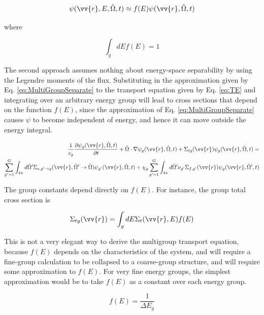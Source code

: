 \documentclass[10pt]{article}
\newcommand{\hO}{\hat{\Omega}}
\newcommand{\spa}{(\vv{r}, E, \hO, t)}
\begin{document}
\begin{flushleft}
\begin{equation}
\label{eq:MultiGroupSeparate}
\psi\spa  \approx f(E)\psi(\vv{r}, \hO  ,t)
\end{equation}

where

\begin{equation}
\label{eq:f_E_normalized}
\int_{g} dEf(E) = 1
\end{equation}

The second approach assumes nothing about energy-space separability by using the Legendre moments of the flux. Substituting in the approximation given by Eq. \ref{eq:MultiGroupSeparate} to the transport equation given by Eq. \ref{eq:TE} and integrating over an arbitrary energy group will lead to cross sections that depend on the function \(f(E)\), since the approximation of Eq. \ref{eq:MultiGroupSeparate} causes \(\psi\) to become independent of energy, and hence it can move outside the energy integral.

\begin{equation}
\label{eq:multigroupTE1}
\begin{aligned}
\frac{1}{v_g}\frac{\partial \psi_g(\vv{r}, \hO  , t)}{\partial t} + \hO  \cdot\nabla\psi_g(\vv{r}, \hO  , t) + \Sigma_{tg}(\vv{r})\psi_g(\vv{r}, \hO  , t) =\\
\sum_{g'=1}^{G} \int_{4\pi}^{} d\hO  ' \Sigma_{s, g'\rightarrow g}(\vv{r}, \hO  ' \rightarrow\hO  )\psi_{g'}(\vv{r}, \hO  , t) + \chi_g \sum_{g'=1}^{G}\int_{4\pi}^{} d\hO  ' \nu_{g'}\Sigma_{f,g'}(\vv{r})\psi_g(\vv{r}, \hO  ', t)
\end{aligned}
\end{equation}

The group constants depend directly on \(f(E)\). For instance, the group total cross section is

\begin{equation}
\label{eq:multigroupTE1_constants1}
\Sigma_{tg}(\vv{r}) = \int_{g} dE \Sigma_t(\vv{r}, E) f(E)
\end{equation}

This is not a very elegant way to derive the multigroup transport equation, because \(f(E)\) depends on the characteristics of the system, and will require a fine-group calculation to be collapsed to a coarse-group structure, and will require some approximation to \(f(E)\). For very fine energy groups, the simplest approximation would be to take \(f(E)\) as a constant over each energy group.

\begin{equation}
\label{eq:FineGroupf_E}
f(E) = \frac{1}{\Delta E_g}
\end{equation}


\end{flushleft}
\end{document}
